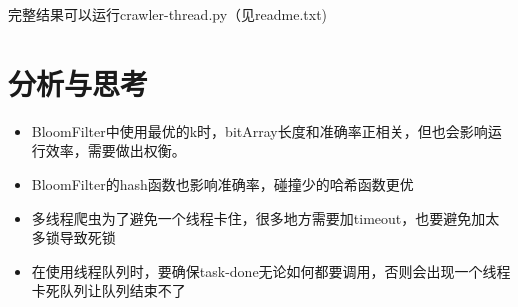 \documentclass[12pt,a4paper]{article}
\begin{document}
完整结果可以运行crawler-thread.py（见readme.txt)


\section{分析与思考}
\begin{itemize}
	\item BloomFilter中使用最优的k时，bitArray长度和准确率正相关，但也会影响运行效率，需要做出权衡。
	\item BloomFilter的hash函数也影响准确率，碰撞少的哈希函数更优
	\item 多线程爬虫为了避免一个线程卡住，很多地方需要加timeout，也要避免加太多锁导致死锁
	\item 在使用线程队列时，要确保task-done无论如何都要调用，否则会出现一个线程卡死队列让队列结束不了
\end{itemize}
\end{document}
